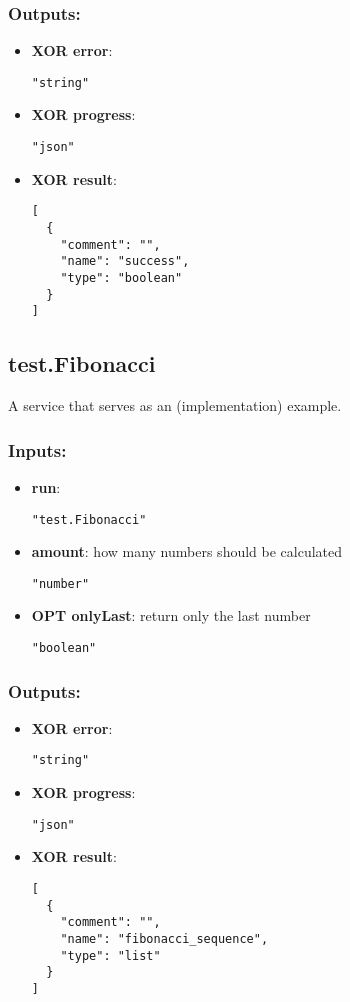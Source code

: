 \subsubsection*{Outputs:}
\begin{itemize}
    \item \textbf{XOR error}: 
\begin{lstlisting}
"string"
\end{lstlisting}
    \item \textbf{XOR progress}: 
\begin{lstlisting}
"json"
\end{lstlisting}
    \item \textbf{XOR result}: 
\begin{lstlisting}
[
  {
    "comment": "", 
    "name": "success", 
    "type": "boolean"
  }
]
\end{lstlisting}
  \end{itemize}

\subsection{test.Fibonacci}
A service that serves as an (implementation) example.
\subsubsection*{Inputs:}
\begin{itemize}
    \item \textbf{run}: 
\begin{lstlisting}
"test.Fibonacci"
\end{lstlisting}
    \item \textbf{amount}: how many numbers should be calculated
\begin{lstlisting}
"number"
\end{lstlisting}
    \item \textbf{OPT onlyLast}: return only the last number
\begin{lstlisting}
"boolean"
\end{lstlisting}
  \end{itemize}

\subsubsection*{Outputs:}
\begin{itemize}
    \item \textbf{XOR error}: 
\begin{lstlisting}
"string"
\end{lstlisting}
    \item \textbf{XOR progress}: 
\begin{lstlisting}
"json"
\end{lstlisting}
    \item \textbf{XOR result}: 
\begin{lstlisting}
[
  {
    "comment": "", 
    "name": "fibonacci_sequence", 
    "type": "list"
  }
]
\end{lstlisting}
  \end{itemize}

